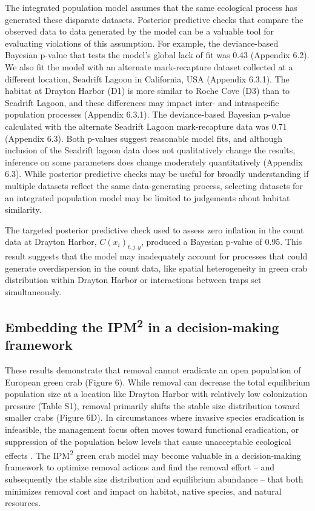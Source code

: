 \documentclass{article}
\begin{document}
The integrated population model assumes that the same ecological process has generated these disparate datasets. Posterior predictive checks that compare the observed data to data generated by the model can be a valuable tool for evaluating violations of this assumption. For example, the deviance-based Bayesian p-value that tests the model’s global lack of fit was 0.43 (Appendix 6.2). We also fit the model with an alternate mark-recapture dataset collected at a different location, Seadrift Lagoon in California, USA (Appendix 6.3.1). The habitat at Drayton Harbor (D1) is more similar to Roche Cove (D3) than to Seadrift Lagoon, and these differences may impact inter- and intraspecific population processes (Appendix 6.3.1). The deviance-based Bayesian p-value calculated with the alternate Seadrift Lagoon mark-recapture data was 0.71 (Appendix 6.3). Both p-values suggest reasonable model fits, and although inclusion of the Seadrift lagoon data does not qualitatively change the results, inference on some parameters does change moderately quantitatively (Appendix 6.3). While posterior predictive checks may be useful for broadly understanding if multiple datasets reflect the same data-generating process, selecting datasets for an integrated population model may be limited to judgements about habitat similarity.

The targeted posterior predictive check used to assess zero inflation in the count data at Drayton Harbor, $C(x_i)_{t,j,y}$, produced a Bayesian p-value of 0.95. This result suggests that the model may inadequately account for processes that could generate overdispersion in the count data, like spatial heterogeneity in green crab distribution within Drayton Harbor or interactions between traps set simultaneously. 

\subsection{Embedding the IPM\textsuperscript{2} in a decision-making framework}

These results demonstrate that removal cannot eradicate an open population of European green crab (Figure 6). While removal can decrease the total equilibrium population size at a location like Drayton Harbor with relatively low colonization pressure (Table S1), removal primarily shifts the stable size distribution toward smaller crabs (Figure 6D). In circumstances where invasive species eradication is infeasible, the management focus often moves toward functional eradication, or suppression of the population below levels that cause unacceptable ecological effects \parencite{green2021functional}. The IPM\textsuperscript{2} green crab model may become valuable in a decision-making framework to optimize removal actions and find the removal effort – and subsequently the stable size distribution and equilibrium abundance – that both minimizes removal cost and impact on habitat, native species, and natural resources. 
\end{document}
